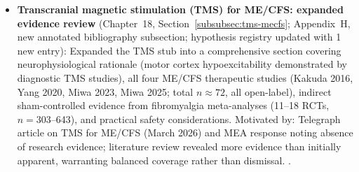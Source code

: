 \begin{itemize}
  \item \textbf{Transcranial magnetic stimulation (TMS) for ME/CFS: expanded evidence review}
    (Chapter~18, Section~\ref{subsubsec:tms-mecfs}; Appendix~H, new annotated
    bibliography subsection; hypothesis registry updated with 1 new entry):
    Expanded the TMS stub into a comprehensive section covering neurophysiological
    rationale (motor cortex hypoexcitability demonstrated by diagnostic TMS studies),
    all four ME/CFS therapeutic studies (Kakuda 2016, Yang 2020, Miwa 2023, Miwa 2025;
    total $n \approx 72$, all open-label), indirect sham-controlled evidence from
    fibromyalgia meta-analyses (11--18 RCTs, $n = 303$--643), and practical safety
    considerations.
    Motivated by: Telegraph article on TMS for ME/CFS (March 2026) and MEA response
    noting absence of research evidence; literature review revealed more evidence than
    initially apparent, warranting balanced coverage rather than dismissal.
    \cite{Kakuda2016rTMS,Yang2020rTMS,Miwa2023rTMS,Miwa2025rTMS,Samii1996TMS,Starr2000TMS,Davey2003TMS,Lefaucheur2020NIBS,Toh2022fibrorTMS,Su2021fibrorTMS}.


\end{itemize}
